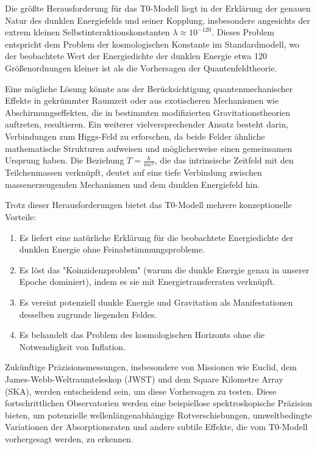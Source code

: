 \documentclass[a4paper,12pt]{article}
\theoremstyle{definition}
\theoremstyle{remark}
\begin{document}
	Die größte Herausforderung für das T0-Modell liegt in der Erklärung der genauen Natur des dunklen Energiefelds und seiner Kopplung, insbesondere angesichts der extrem kleinen Selbstinteraktionskonstanten $\lambda \approx 10^{-120}$. Dieses Problem entspricht dem Problem der kosmologischen Konstante im Standardmodell, wo der beobachtete Wert der Energiedichte der dunklen Energie etwa 120 Größenordnungen kleiner ist als die Vorhersagen der Quantenfeldtheorie.
	
	Eine mögliche Lösung könnte aus der Berücksichtigung quantenmechanischer Effekte in gekrümmter Raumzeit oder aus exotischeren Mechanismen wie Abschirmungseffekten, die in bestimmten modifizierten Gravitationstheorien auftreten, resultieren. Ein weiterer vielversprechender Ansatz besteht darin, Verbindungen zum Higgs-Feld zu erforschen, da beide Felder ähnliche mathematische Strukturen aufweisen und möglicherweise einen gemeinsamen Ursprung haben. Die Beziehung $T = \frac{\hbar}{mc^2}$, die das intrinsische Zeitfeld mit den Teilchenmassen verknüpft, deutet auf eine tiefe Verbindung zwischen massenerzeugenden Mechanismen und dem dunklen Energiefeld hin.
	
	Trotz dieser Herausforderungen bietet das T0-Modell mehrere konzeptionelle Vorteile:
	
	\begin{enumerate}
		\item Es liefert eine natürliche Erklärung für die beobachtete Energiedichte der dunklen Energie ohne Feinabstimmungsprobleme.
		\item Es löst das "Koinzidenzproblem" (warum die dunkle Energie genau in unserer Epoche dominiert), indem es sie mit Energietransferraten verknüpft.
		\item Es vereint potenziell dunkle Energie und Gravitation als Manifestationen desselben zugrunde liegenden Feldes.
		\item Es behandelt das Problem des kosmologischen Horizonts ohne die Notwendigkeit von Inflation.
	\end{enumerate}
	
	Zukünftige Präzisionsmessungen, insbesondere von Missionen wie Euclid, dem James-Webb-Weltraumteleskop (JWST) und dem Square Kilometre Array (SKA), werden entscheidend sein, um diese Vorhersagen zu testen. Diese fortschrittlichen Observatorien werden eine beispiellose spektroskopische Präzision bieten, um potenzielle wellenlängenabhängige Rotverschiebungen, umweltbedingte Variationen der Absorptionsraten und andere subtile Effekte, die vom T0-Modell vorhergesagt werden, zu erkennen.
	
\end{document}
